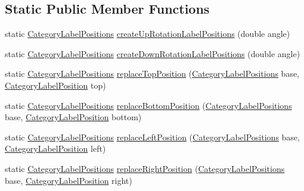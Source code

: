\subsection*{Static Public Member Functions}
\begin{DoxyCompactItemize}
\item 
static \mbox{\hyperlink{classorg_1_1jfree_1_1chart_1_1axis_1_1_category_label_positions}{Category\+Label\+Positions}} \mbox{\hyperlink{classorg_1_1jfree_1_1chart_1_1axis_1_1_category_label_positions_a15845d31a6799d16451089dfac9c9b8b}{create\+Up\+Rotation\+Label\+Positions}} (double angle)
\item 
static \mbox{\hyperlink{classorg_1_1jfree_1_1chart_1_1axis_1_1_category_label_positions}{Category\+Label\+Positions}} \mbox{\hyperlink{classorg_1_1jfree_1_1chart_1_1axis_1_1_category_label_positions_ad3126abddb79cc121679617abb76aa80}{create\+Down\+Rotation\+Label\+Positions}} (double angle)
\item 
static \mbox{\hyperlink{classorg_1_1jfree_1_1chart_1_1axis_1_1_category_label_positions}{Category\+Label\+Positions}} \mbox{\hyperlink{classorg_1_1jfree_1_1chart_1_1axis_1_1_category_label_positions_ae94a06a123d7e602fd7c58caabce751b}{replace\+Top\+Position}} (\mbox{\hyperlink{classorg_1_1jfree_1_1chart_1_1axis_1_1_category_label_positions}{Category\+Label\+Positions}} base, \mbox{\hyperlink{classorg_1_1jfree_1_1chart_1_1axis_1_1_category_label_position}{Category\+Label\+Position}} top)
\item 
static \mbox{\hyperlink{classorg_1_1jfree_1_1chart_1_1axis_1_1_category_label_positions}{Category\+Label\+Positions}} \mbox{\hyperlink{classorg_1_1jfree_1_1chart_1_1axis_1_1_category_label_positions_a80e897eac8ba6b82dca0d129ce4b9bce}{replace\+Bottom\+Position}} (\mbox{\hyperlink{classorg_1_1jfree_1_1chart_1_1axis_1_1_category_label_positions}{Category\+Label\+Positions}} base, \mbox{\hyperlink{classorg_1_1jfree_1_1chart_1_1axis_1_1_category_label_position}{Category\+Label\+Position}} bottom)
\item 
static \mbox{\hyperlink{classorg_1_1jfree_1_1chart_1_1axis_1_1_category_label_positions}{Category\+Label\+Positions}} \mbox{\hyperlink{classorg_1_1jfree_1_1chart_1_1axis_1_1_category_label_positions_acce71ddd0f3c48f730178a798a0e721b}{replace\+Left\+Position}} (\mbox{\hyperlink{classorg_1_1jfree_1_1chart_1_1axis_1_1_category_label_positions}{Category\+Label\+Positions}} base, \mbox{\hyperlink{classorg_1_1jfree_1_1chart_1_1axis_1_1_category_label_position}{Category\+Label\+Position}} left)
\item 
static \mbox{\hyperlink{classorg_1_1jfree_1_1chart_1_1axis_1_1_category_label_positions}{Category\+Label\+Positions}} \mbox{\hyperlink{classorg_1_1jfree_1_1chart_1_1axis_1_1_category_label_positions_a6fd801801ccd30faa4db9b8a7ebded57}{replace\+Right\+Position}} (\mbox{\hyperlink{classorg_1_1jfree_1_1chart_1_1axis_1_1_category_label_positions}{Category\+Label\+Positions}} base, \mbox{\hyperlink{classorg_1_1jfree_1_1chart_1_1axis_1_1_category_label_position}{Category\+Label\+Position}} right)
\end{DoxyCompactItemize}

